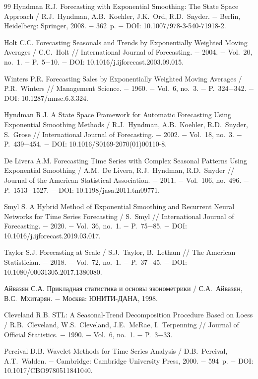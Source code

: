 \documentclass[a4paper,14pt]{extarticle}
\begin{document}
\begin{thebibliography}{99}
 Hyndman R.J. Forecasting with Exponential Smoothing: The State Space Approach / R.J.~Hyndman, A.B.~Koehler, J.K.~Ord, R.D.~Snyder. − Berlin, Heidelberg: Springer, 2008. − 362~p. − DOI: 10.1007/978-3-540-71918-2.

 Holt C.C. Forecasting Seasonals and Trends by Exponentially Weighted Moving Averages / C.C.~Holt // International Journal of Forecasting. − 2004. − Vol.~20, no.~1. − P.~5−10. − DOI: 10.1016/j.ijforecast.2003.09.015.

 Winters P.R. Forecasting Sales by Exponentially Weighted Moving Averages / P.R.~Winters // Management Science. − 1960. − Vol.~6, no.~3. − P.~324−342. − DOI: 10.1287/mnsc.6.3.324.

 Hyndman R.J. A State Space Framework for Automatic Forecasting Using Exponential Smoothing Methods / R.J.~Hyndman, A.B.~Koehler, R.D.~Snyder, S.~Grose // International Journal of Forecasting. − 2002. − Vol.~18, no.~3. − P.~439−454. − DOI: 10.1016/S0169-2070(01)00110-8.

 De Livera A.M. Forecasting Time Series with Complex Seasonal Patterns Using Exponential Smoothing / A.M.~De Livera, R.J.~Hyndman, R.D.~Snyder // Journal of the American Statistical Association. − 2011. − Vol.~106, no.~496. − P.~1513−1527. − DOI: 10.1198/jasa.2011.tm09771.

 Smyl S. A Hybrid Method of Exponential Smoothing and Recurrent Neural Networks for Time Series Forecasting / S.~Smyl // International Journal of Forecasting. − 2020. − Vol.~36, no.~1. − P.~75−85. − DOI: 10.1016/j.ijforecast.2019.03.017.

 Taylor S.J. Forecasting at Scale / S.J.~Taylor, B.~Letham // The American Statistician. − 2018. − Vol.~72, no.~1. − P.~37−45. − DOI: 10.1080/00031305.2017.1380080.

 Айвазян С.А. Прикладная статистика и основы эконометрики / С.А.~Айвазян, В.С.~Мхитарян. − Москва: ЮНИТИ-ДАНА, 1998.

 Cleveland R.B. STL: A Seasonal-Trend Decomposition Procedure Based on Loess / R.B.~Cleveland, W.S.~Cleveland, J.E.~McRae, I.~Terpenning // Journal of Official Statistics. − 1990. − Vol.~6, no.~1. − P.~3−33.

 Percival D.B. Wavelet Methods for Time Series Analysis / D.B.~Percival, A.T.~Walden. − Cambridge: Cambridge University Press, 2000. − 594~p. − DOI: 10.1017/CBO9780511841040.


\end{thebibliography}
\end{document}
